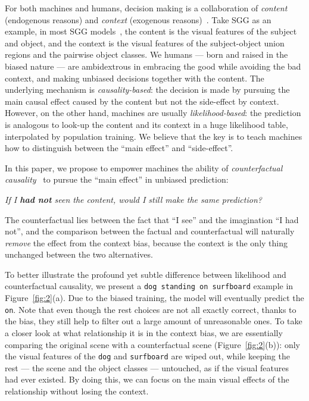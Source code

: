 \documentclass[10pt,twocolumn,letterpaper]{article}
\begin{document}
For both machines and humans, decision making is a collaboration of \emph{content} (endogenous reasons) and \emph{context} (exogenous reasons)~\cite{van2015cognitive}. Take SGG as an example, in most SGG models~\cite{zellers2018neural,chen2019counterfactual,zhang2019graphical}, the content is the visual features of the subject and object, and the context is the visual features of the subject-object union regions and the pairwise object classes. We humans --- born and raised in the biased nature --- are ambidextrous in embracing the good while avoiding the bad context, and making unbiased decisions together with the content. The underlying mechanism is \emph{causality-based}: the decision is made by pursuing the main causal effect caused by the content but not the side-effect by context. However, on the other hand, machines are usually \emph{likelihood-based}: the prediction is analogous to look-up the content and its context in a huge likelihood table, interpolated by population training. We believe that the key is to teach machines how to distinguish between the ``main effect'' and ``side-effect''. 

In this paper, we propose to empower machines the ability of \emph{counterfactual causality}~\cite{Judea2018thebookofwhy} to pursue the ``main effect'' in unbiased prediction:
\begin{adjustwidth}{0.3cm}{0.3cm}
\vspace{1pt}
\noindent\textit{If I \textbf{had not} seen the content, would I still make the same prediction?}
\vspace{1pt}
\end{adjustwidth}
The counterfactual lies between the fact that ``I see'' and the imagination ``I had not'', and the comparison between the factual and counterfactual will naturally \emph{remove} the effect from the context bias, because the context is the only thing unchanged between the two alternatives.

To better illustrate the profound yet subtle difference between likelihood and counterfactual causality, we present a \texttt{dog standing on surfboard} example in Figure~\ref{fig:2}(a). Due to the biased training, the model will eventually predict the \texttt{on}. Note that even though the rest choices are not all exactly correct, thanks to the bias, they still help to filter out a large amount of unreasonable ones. To take a closer look at what relationship it is in the context bias, we are essentially comparing the original scene with a counterfactual scene (Figure~\ref{fig:2}(b)): only the visual features of the \texttt{dog} and \texttt{surfboard} are wiped out, while keeping the rest --- the scene and the object classes --- untouched, as if the visual features had ever existed. By doing this, we can focus on the main visual effects of the relationship without losing the context. 
\end{document}
